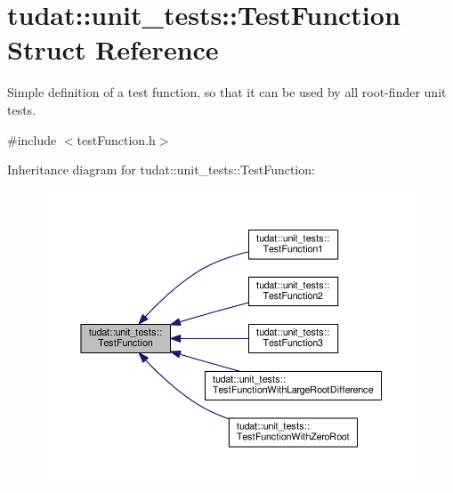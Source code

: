 \hypertarget{structtudat_1_1unit__tests_1_1TestFunction}{}\section{tudat\+:\+:unit\+\_\+tests\+:\+:Test\+Function Struct Reference}
\label{structtudat_1_1unit__tests_1_1TestFunction}


Simple definition of a test function, so that it can be used by all root-\/finder unit tests.  




{\ttfamily \#include $<$test\+Function.\+h$>$}



Inheritance diagram for tudat\+:\+:unit\+\_\+tests\+:\+:Test\+Function\+:
\nopagebreak
\begin{figure}[H]
\begin{center}
\leavevmode
\includegraphics[width=350pt]{structtudat_1_1unit__tests_1_1TestFunction__inherit__graph}
\end{center}
\end{figure}
